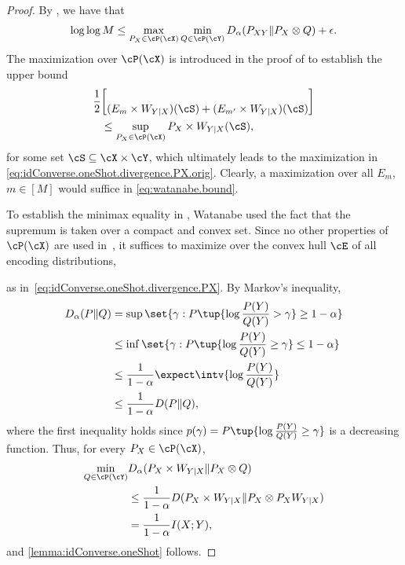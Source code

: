 \documentclass[conference,final]{IEEEtran}
\begin{document}
\begin{proof}
  By 
  \cite[Corollary~2 and~Lemma~1]{Watanabe2022MinimaxConverseIdentification},
  we have that
  \begin{gather}
    \label{eq:idConverse.oneShot.divergence.PX.orig}
    \log\log M
    \le \max_{P_X \in \cP(\cX)} \min_{Q \in \cP(\cY)}
      D_\alpha (P_{XY} \| P_X \otimes Q)
      + \epsilon.
  \end{gather}
  The maximization over $\cP(\cX)$ is introduced in
  the proof of \cite[Theorem~1]{Watanabe2022MinimaxConverseIdentification}
  to establish the upper bound
  \begin{align}
    \label{eq:watanabe.bound}
    \frac{1}{2} &\brack{ (E_m \times W_{Y|X}) (\cS) + (E_{m'} \times W_{Y|X}) (\cS) }
    \nonumber
    \\
    &\le
    \sup_{P_X \in \cP(\cX)} P_X \times W_{Y|X} (\cS),
  \end{align}
  for some set $\cS \subseteq \cX \times \cY$,
  which ultimately leads to the maximization in
  \cref{eq:idConverse.oneShot.divergence.PX.orig}.
  Clearly, a maximization over all $E_m$, $m \in [M]$
  would suffice in \cref{eq:watanabe.bound}.
  
  To
  establish the minimax equality in \cite[Corollary~2]{Watanabe2022MinimaxConverseIdentification},
  Watanabe used the fact that the supremum is taken over
  a compact and convex set. Since no 
  other
  properties
  of $\cP(\cX)$ are used in~\cite{Watanabe2022MinimaxConverseIdentification},
  it suffices to maximize over the convex hull $\cE$
  of all encoding distributions, 
  
  as in~\cref{eq:idConverse.oneShot.divergence.PX}.
  By Markov's inequality,
  \begin{align}
    D_\alpha(P \| Q)
    &
      = \sup\set{ \gamma : P\tup{ \log \frac{P(Y)}{Q(Y)} > \gamma } \ge 1 - \alpha }
    \\&
      \le \inf\set{ \gamma : P\tup{ \log \frac{P(Y)}{Q(Y)} \ge \gamma } \le 1 - \alpha }
    \\&
      \le \frac{1}{1-\alpha} \expect\intv{ \log\frac{P(Y)}{Q(Y)} }
    \\&
      \le \frac{1}{1-\alpha} D(P\|Q),
  \end{align}
  where the first inequality holds since $p(\gamma) = P\tup{\log\frac{P(Y)}{Q(Y)} \ge \gamma}$ is a decreasing function.
  Thus, for every $P_X \in \cP(\cX)$,
  \begin{align}
    \min_{Q \in \cP(\cY)}
    \nonumber
      & D_\alpha(P_X \times W_{Y|X} \| P_X \otimes Q)
    \\& \le \frac{1}{1-\alpha} D(P_X \times W_{Y|X} \| P_X \otimes P_X W_{Y|X})
    \\& =   \frac{1}{1-\alpha} I(X; Y),
  \end{align}
  and \cref{lemma:idConverse.oneShot} follows.
\end{proof}
\end{document}
